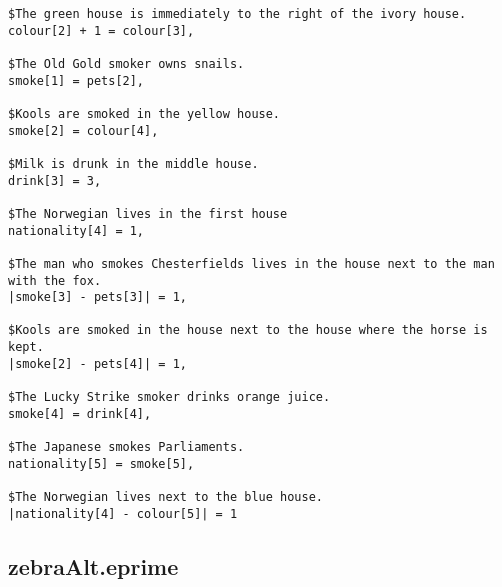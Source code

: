 \documentclass{article}
\begin{document}
\begin{verbatim}
$The green house is immediately to the right of the ivory house.
colour[2] + 1 = colour[3],

$The Old Gold smoker owns snails.
smoke[1] = pets[2],

$Kools are smoked in the yellow house.
smoke[2] = colour[4],

$Milk is drunk in the middle house.
drink[3] = 3,

$The Norwegian lives in the first house
nationality[4] = 1,

$The man who smokes Chesterfields lives in the house next to the man with the fox.
|smoke[3] - pets[3]| = 1,

$Kools are smoked in the house next to the house where the horse is kept.
|smoke[2] - pets[4]| = 1,

$The Lucky Strike smoker drinks orange juice.
smoke[4] = drink[4],

$The Japanese smokes Parliaments.
nationality[5] = smoke[5],

$The Norwegian lives next to the blue house.
|nationality[4] - colour[5]| = 1
\end{verbatim}
\subsection{zebraAlt.eprime}
\end{document}
